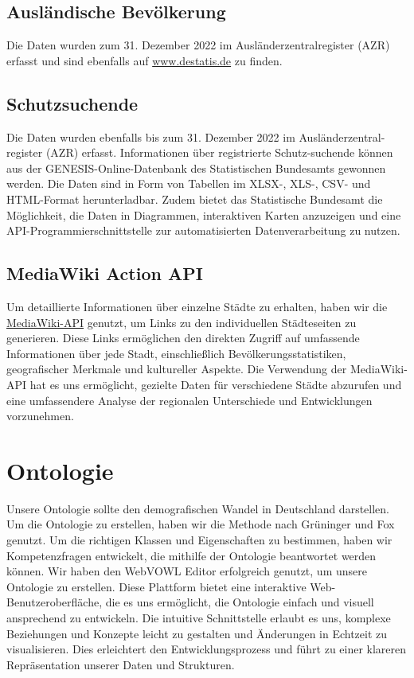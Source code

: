 \documentclass[a4paper, 12pt]{article}
\begin{document}
\subsection{Ausländische Bevölkerung}
Die Daten wurden zum 31. Dezember 2022 im Ausländerzentralregister \linebreak (AZR) erfasst und sind ebenfalls auf \href{www.destatis.de}{www.destatis.de} zu finden.

\subsection{Schutzsuchende}
Die Daten wurden ebenfalls bis zum 31. Dezember 2022 im Ausländerzentral-\linebreak register (AZR) erfasst. Informationen über registrierte Schutz-\linebreak suchende können aus der GENESIS-Online-Datenbank des Statistischen Bundesamts gewonnen werden. Die Daten sind in Form von Tabellen im XLSX-, XLS-, CSV- und HTML-Format herunterladbar. Zudem bietet das Statistische Bundesamt die Möglichkeit, die Daten in Diagrammen, interaktiven Karten anzuzeigen und eine API-Programmierschnittstelle zur automatisierten Datenverarbeitung zu nutzen.


\subsection{MediaWiki Action API}
Um detaillierte Informationen über einzelne Städte zu erhalten, haben wir die \href{https://www.mediawiki.org/wiki/API:Main_page}{MediaWiki-API} genutzt, um Links zu den individuellen Städteseiten zu generieren. Diese Links ermöglichen den direkten Zugriff auf umfassende Informationen über jede Stadt, einschließlich Bevölkerungsstatistiken, geografischer Merkmale und kultureller Aspekte. Die Verwendung der MediaWiki-API hat es uns ermöglicht, gezielte Daten für verschiedene Städte abzurufen und eine umfassendere Analyse der regionalen Unterschiede und Entwicklungen vorzunehmen.

\section{Ontologie}
Unsere Ontologie sollte den demografischen Wandel in Deutschland darstellen. Um die Ontologie zu erstellen, haben wir die Methode nach Grüninger und Fox genutzt. Um die richtigen Klassen und Eigenschaften zu bestimmen, haben wir Kompetenzfragen entwickelt, die mithilfe der Ontologie beantwortet werden können. Wir haben den WebVOWL Editor erfolgreich genutzt, um unsere Ontologie zu erstellen. Diese Plattform bietet eine interaktive Web-Benutzeroberfläche, die es uns ermöglicht, die Ontologie einfach und visuell ansprechend zu entwickeln. Die intuitive Schnittstelle erlaubt es uns, komplexe Beziehungen und Konzepte leicht zu gestalten und Änderungen in Echtzeit zu visualisieren. Dies erleichtert den Entwicklungsprozess und führt zu einer klareren Repräsentation unserer Daten und Strukturen.
\newline \newline
\end{document}
